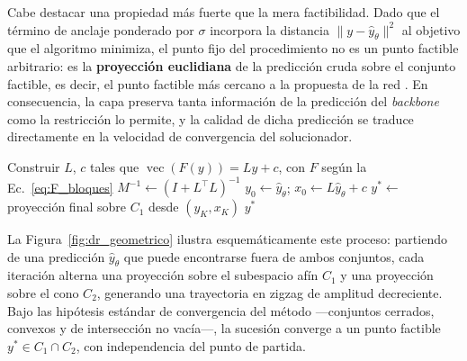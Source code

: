 Cabe destacar una propiedad más fuerte que la mera factibilidad. Dado que el término de 
anclaje ponderado por $\sigma$ incorpora la distancia $\lVert y - \hat{y}_\theta 
\rVert^2$ al objetivo que el algoritmo minimiza, el punto fijo del procedimiento no es 
un punto factible arbitrario: es la \textbf{proyección euclidiana} de la predicción 
cruda sobre el conjunto factible, es decir, el punto factible más cercano a la 
propuesta de la red \cite{tang2026lminet}. En consecuencia, la capa preserva tanta 
información de la predicción del \textit{backbone} como la restricción lo permite, y 
la calidad de dicha predicción se traduce directamente en la velocidad de convergencia 
del solucionador.

\begin{algobox}
\begin{algorithm}[H]
    \SetAlgoLined
    Construir $L$, $c$ tales que $\operatorname{vec}(F(y)) = Ly + c$, con $F$ según 
    la Ec.~\eqref{eq:F_bloques}\;
    $M^{-1} \leftarrow (I + L^\top L)^{-1}$\;
    $y_0 \leftarrow \hat{y}_\theta$; \quad $x_0 \leftarrow L\hat{y}_\theta + c$\;
    $y^* \leftarrow$ proyección final sobre $C_1$ desde $(y_K, x_K)$\;
    \Return $y^*$\;
    \caption{Douglas--Rachford para la Proyección de la LMI (según implementación)}
    \label{algo:dr_concreto}
\end{algorithm}
\end{algobox}




La Figura~\ref{fig:dr_geometrico} ilustra esquemáticamente este proceso: partiendo de una 
predicción $\hat{y}_\theta$ que puede encontrarse fuera de ambos conjuntos, cada iteración alterna 
una proyección sobre el subespacio afín $C_1$ y una proyección sobre el cono $C_2$, generando una 
trayectoria en zigzag de amplitud decreciente. Bajo las hipótesis estándar de convergencia del 
método ---conjuntos cerrados, convexos y de intersección no vacía---, la sucesión converge a un 
punto factible $y^*\in C_1\cap C_2$, con independencia del punto de partida.

